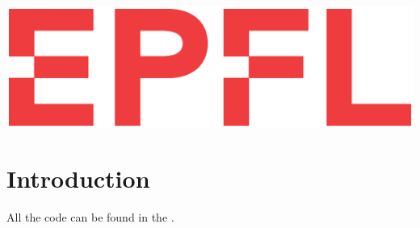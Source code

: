 \documentclass[14pt,a4paper]{article}
\theoremstyle{definition}
\numberwithin{equation}{subsection}
\begin{document}
\begin{titlepage}
\centering
 \includegraphics[width=0.5\linewidth]{img/logo.eps}\\ %

 
 

\vfill %


\end{titlepage}

\thispagestyle{empty}
\clearpage\null



\newpage
\pagestyle{fancy}
\fancyhead[L]{}




\tableofcontents
{}

\newpage


\thispagestyle{empty}
\clearpage\null\newpage






\section{Introduction}

All the code can be found in the \cite{GIT}.
\end{document}
